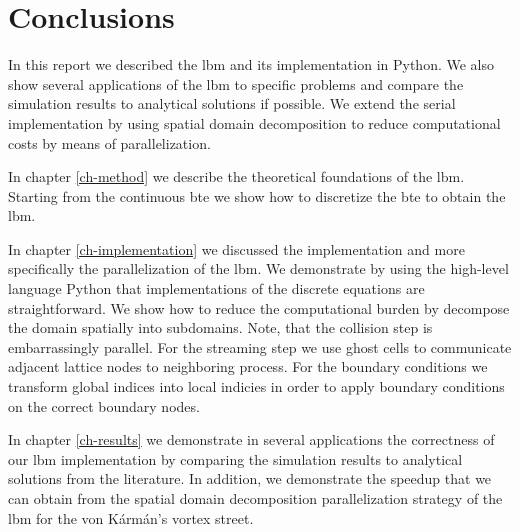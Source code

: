 \documentclass[a4paper,11pt, footsepline]{book}
\begin{document}
\chapter{Conclusions}\label{ch-conclusion}
In this report we described the \ac{lbm} and its implementation in Python. We also show several applications of the \ac{lbm} to specific problems and compare the simulation results to analytical solutions if possible. We extend the serial implementation by using spatial domain decomposition to reduce computational costs by means of parallelization.

In chapter \ref{ch-method} we describe the theoretical foundations of the \ac{lbm}. Starting from the continuous \ac{bte} we show how to discretize the \ac{bte} to obtain the \ac{lbm}.

In chapter \ref{ch-implementation} we discussed the implementation and more specifically the parallelization of the \ac{lbm}. We demonstrate by using the high-level language Python that implementations of the discrete equations are straightforward. We show how to reduce the computational burden by decompose the domain spatially into subdomains. Note, that the collision step is embarrassingly parallel. For the streaming step we use ghost cells to communicate adjacent lattice nodes to neighboring process. For the boundary conditions we transform global indices into local indicies in order to apply boundary conditions on the correct boundary nodes.

In chapter \ref{ch-results} we demonstrate in several applications the correctness of our \ac{lbm} implementation by comparing the simulation results to analytical solutions from the literature. In addition, we demonstrate the speedup that we can obtain from the spatial domain decomposition parallelization strategy of the \ac{lbm} for the von K\'{a}rm\'{a}n's vortex street.

\newpage



\end{document}
